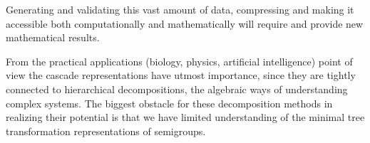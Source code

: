 \documentclass{amsart}
\newcommand{\todo}[1]{ \textsf{\color{red}{[TODO:  #1 ]}}}
\begin{document}
Generating  and validating this vast amount of data, compressing and making it accessible both computationally and mathematically  will require and provide new mathematical results.    

From the practical applications (biology, physics, artificial intelligence) point of view the cascade representations have utmost importance, since they are tightly connected to hierarchical decompositions, the algebraic ways of understanding complex systems. The biggest obstacle for these decomposition methods in realizing their potential is that we have limited understanding of the minimal tree transformation representations of semigroups. 

\todo{Are there questions for Temperley-Lieb that can potentially answered by these methods?}
\end{document}
